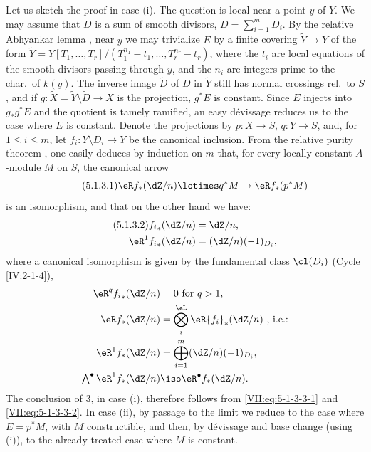 \documentclass[oneside]{book}
\begin{document}
Let us sketch the proof in case (i). The question is local near a point $y$
of $Y$. We may assume that $D$ is a sum of smooth divisors,
$D=\sum_{i=1}^m D_i$. By the relative Abhyankar lemma
\cite[XIII 5.5]{sga1}, near $y$ we may trivialize $E$ by a finite covering
$\widetilde Y\to Y$ of the form
$\widetilde Y=Y[T_1,\dots,T_r]/(T_1^{n_1}-t_1,\dots,T_r^{n_r}-t_r)$, where the
$t_i$ are local equations of the smooth divisors passing through $y$, and the
$n_i$ are integers prime to the char.\ of $k(y)$. The inverse image
$\widetilde D$ of $D$ in $\widetilde Y$ still has normal crossings rel.\ to $S$, and
if $g:\widetilde X=\widetilde Y\setminus \widetilde D\to X$ is the projection,
$g^\ast E$ is constant. Since $E$ injects into $g_\ast g^\ast E$ and the
quotient is tamely ramified, an easy dévissage reduces us to the case where
$E$ is constant. Denote the projections by $p:X\to S$, $q:Y\to S$, and, for
$1\leqslant i\leqslant m$, let $f_i:Y\setminus D_i \to Y$ be the canonical
inclusion. From the relative purity theorem \cite[XVI 3.7]{sga4}, one easily
deduces by induction on $m$ that, for every locally constant $A$-module $M$ on
$S$, the canonical arrow
\begin{equation*}\tag{5.1.3.1}\label{VII:eq:5-1-3-3-1} %
  \eR f_\ast (\dZ/n)\lotimes q^\ast M\to \eR f_\ast (p^\ast M) 
\end{equation*}
is an isomorphism, and that on the other hand we have:
\begin{align*}\tag{5.1.3.2}\label{VII:eq:5-1-3-3-2}
  {f_i}_\ast(\dZ/n) &= \dZ/n \text{,} \\
  \eR^1 {f_i}_\ast (\dZ/n) &= (\dZ/n)(-1)_{D_i} \text{,} 
\end{align*}
where a canonical isomorphism is given by the fundamental class $\cl(D_i)$
(\hyperref[IV]{Cycle} \ref{IV:2-1-4}),
\begin{align*}
  \eR^q {f_i}_\ast(\dZ/n) &= 0\text{ for $q>1$,} \\
  \eR f_\ast (\dZ/n) &= \bigotimes_i^\eL \eR {f_i}_\ast (\dZ/n) \text{ , i.e.:} \\
  \eR^1 f_\ast(\dZ/n) &= \bigoplus_{i=1}^m (\dZ/n)(-1)_{D_i} \text{,} \\
  \textstyle\bigwedge^\bullet \eR^1 f_\ast(\dZ/n) &\iso \eR^\bullet f_\ast (\dZ/n) \text{.} 
\end{align*}
The conclusion of 3, in case (i), therefore follows from
\eqref{VII:eq:5-1-3-3-1} and \eqref{VII:eq:5-1-3-3-2}. In case (ii), by
passage to the limit we reduce to the case where $E=p^\ast M$, with $M$
constructible, and then, by dévissage and base change (using (i)), to the
already treated case where $M$ is constant.
\end{document}
